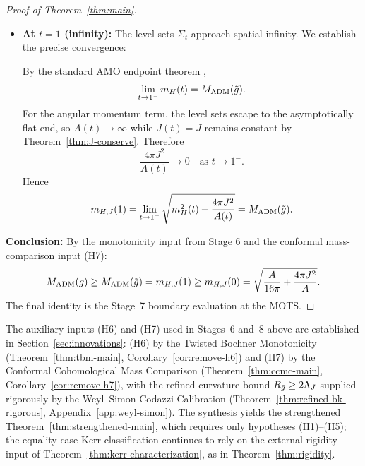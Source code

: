 \begin{proof}[Proof of Theorem~\ref{thm:main}]
\begin{itemize}
    \item \textbf{At $t = 1$ (infinity):} The level sets $\Sigma_t$ approach spatial infinity. We establish the precise convergence:

    By the standard AMO endpoint theorem \cite[Theorem~1.3]{amo2022},
    \[
    \lim_{t\to 1^-} m_H(t)=M_{\mathrm{ADM}}(\tilde{g}).
    \]
    For the angular momentum term, the level sets escape to the asymptotically flat end, so $A(t)\to\infty$ while $J(t)=J$ remains constant by Theorem~\ref{thm:J-conserve}. Therefore
    \[
    \frac{4\pi J^2}{A(t)} \to 0 \quad \text{as } t \to 1^-.
    \]
    Hence
    \[
    m_{H,J}(1)=\lim_{t\to 1^-}\sqrt{m_H^2(t)+\frac{4\pi J^2}{A(t)}}=M_{\mathrm{ADM}}(\tilde{g}).
    \]
\end{itemize}

\textbf{Conclusion:}
By the monotonicity input from Stage 6 and the conformal mass-comparison input (H7):
\[
M_{\mathrm{ADM}}(g) \geq M_{\mathrm{ADM}}(\tilde{g}) = m_{H,J}(1) \geq m_{H,J}(0) = \sqrt{\frac{A}{16\pi} + \frac{4\pi J^2}{A}}.
\]
The final identity is the Stage~7 boundary evaluation at the MOTS.
\end{proof}

\begin{remark}\label{rem:sec08-strengthened}
The auxiliary inputs (H6) and (H7) used in Stages~6 and~8 above are established in Section~\ref{sec:innovations}: (H6) by the Twisted Bochner Monotonicity (Theorem~\ref{thm:tbm-main}, Corollary~\ref{cor:remove-h6}) and (H7) by the Conformal Cohomological Mass Comparison (Theorem~\ref{thm:ccmc-main}, Corollary~\ref{cor:remove-h7}), with the refined curvature bound $R_{\bar{g}}\geq 2\Lambda_J$ supplied rigorously by the Weyl--Simon Codazzi Calibration (Theorem~\ref{thm:refined-bk-rigorous}, Appendix~\ref{app:weyl-simon}). The synthesis yields the strengthened Theorem~\ref{thm:strengthened-main}, which requires only hypotheses (H1)--(H5); the equality-case Kerr classification continues to rely on the external rigidity input of Theorem~\ref{thm:kerr-characterization}, as in Theorem~\ref{thm:rigidity}.
\end{remark}

